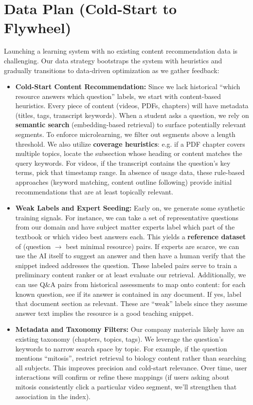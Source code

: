 \documentclass[11pt]{article}
\begin{document}
\section{Data Plan (Cold-Start to Flywheel)}
Launching a learning system with no existing content recommendation data is challenging. Our data strategy bootstraps the system with heuristics and gradually transitions to data-driven optimization as we gather feedback:
\begin{itemize}
  \item \textbf{Cold-Start Content Recommendation:} Since we lack historical “which resource answers which question” labels, we start with content-based heuristics. Every piece of content (videos, PDFs, chapters) will have metadata (titles, tags, transcript keywords). When a student asks a question, we rely on \textbf{semantic search} (embedding-based retrieval) to surface potentially relevant segments. To enforce microlearning, we filter out segments above a length threshold. We also utilize \textbf{coverage heuristics}: e.g. if a PDF chapter covers multiple topics, locate the subsection whose heading or content matches the query keywords. For videos, if the transcript contains the question’s key terms, pick that timestamp range. In absence of usage data, these rule-based approaches (keyword matching, content outline following) provide initial recommendations that are at least topically relevant.
  \item \textbf{Weak Labels and Expert Seeding:} Early on, we generate some synthetic training signals. For instance, we can take a set of representative questions from our domain and have subject matter experts label which part of the textbook or which video best answers each. This yields a \textbf{reference dataset} of (question $\to$ best minimal resource) pairs. If experts are scarce, we can use the AI itself to suggest an answer and then have a human verify that the snippet indeed addresses the question. These labeled pairs serve to train a preliminary content ranker or at least evaluate our retrieval. Additionally, we can use Q\&A pairs from historical assessments to map onto content: for each known question, see if its answer is contained in any document. If yes, label that document section as relevant. These are “weak” labels since they assume answer text implies the resource is a good teaching snippet.
  \item \textbf{Metadata and Taxonomy Filters:} Our company materials likely have an existing taxonomy (chapters, topics, tags). We leverage the question’s keywords to narrow search space by topic. For example, if the question mentions “mitosis”, restrict retrieval to biology content rather than searching all subjects. This improves precision and cold-start relevance. Over time, user interactions will confirm or refine these mappings (if users asking about mitosis consistently click a particular video segment, we’ll strengthen that association in the index).

\end{itemize}
\end{document}
